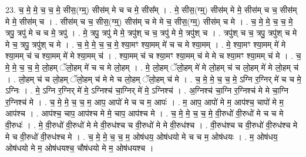\documentclass[17pt]{extarticle}
\begin{document}
23. च॒ मे॒ मे॒ च॒ च॒ मे॒ सीस॒(ग्म्॒) सीस॑म् मे च च मे॒ सीस᳚म् । . मे॒ सीस॒(ग्म्॒) सीस॑म् मे मे॒ सीस॑म् च च॒ सीस॑म् मे मे॒ सीस॑म् च । . सीस॑म् च च॒ सीस॒(ग्म्॒) सीस॑म् च मे मे च॒ सीस॒(ग्म्॒) सीस॑म् च मे । . च॒ मे॒ मे॒ च॒ च॒ मे॒ त्रपु॒ त्रपु॑ मे च च मे॒ त्रपु॑ । . मे॒ त्रपु॒ त्रपु॑ मे मे॒ त्रपु॑श् च च॒ त्रपु॑ मे मे॒ त्रपु॑श् च । . त्रपु॑श् च च॒ त्रपु॒ त्रपु॑श् च मे मे च॒ त्रपु॒ त्रपु॑श् च मे । . च॒ मे॒ मे॒ च॒ च॒ मे॒ श्या॒मꣳ श्या॒मम् मे॑ च च मे श्या॒मम् । . मे॒ श्या॒मꣳ श्या॒मम् मे॑ मे श्या॒मम् च॑ च श्या॒मम् मे॑ मे श्या॒मम् च॑ । . श्या॒मम् च॑ च श्या॒मꣳ श्या॒मम् च॑ मे मे च श्या॒मꣳ श्या॒मम् च॑ मे । . च॒ मे॒ मे॒ च॒ च॒ मे॒ लो॒हम् ॅलो॒हम् मे॑ च च मे लो॒हम् । . मे॒ लो॒हम् ॅलो॒हम् मे॑ मे लो॒हम् च॑ च लो॒हम् मे॑ मे लो॒हम् च॑ । . लो॒हम् च॑ च लो॒हम् ॅलो॒हम् च॑ मे मे च लो॒हम् ॅलो॒हम् च॑ मे । . च॒ मे॒ मे॒ च॒ च॒ मे॒ ऽग्नि र॒ग्निर् मे॑ च च मे॒ ऽग्निः । . मे॒ ऽग्नि र॒ग्निर् मे॑ मे॒ ऽग्निश्च॑ चा॒ग्निर् मे॑ मे॒ ऽग्निश्च॑ । . अ॒ग्निश्च॑ चा॒ग्नि र॒ग्निश्च॑ मे मे चा॒ग्नि र॒ग्निश्च॑ मे । . च॒ मे॒ मे॒ च॒ च॒ म॒ आप॒ आपो॑ मे च च म॒ आपः॑ । . म॒ आप॒ आपो॑ मे म॒ आप॑श्च॒ चापो॑ मे म॒ आप॑श्च । . आप॑श्च॒ चाप॒ आप॑श्च मे मे॒ चाप॒ आप॑श्च मे । . च॒ मे॒ मे॒ च॒ च॒ मे॒ वी॒रुधो॑ वी॒रुधो॑ मे च च मे वी॒रुधः॑ । . मे॒ वी॒रुधो॑ वी॒रुधो॑ मे मे वी॒रुध॑श्च च वी॒रुधो॑ मे मे वी॒रुध॑श्च । . वी॒रुध॑श्च च वी॒रुधो॑ वी॒रुध॑श्च मे मे च वी॒रुधो॑ वी॒रुध॑श्च मे । . च॒ मे॒ मे॒ च॒ च॒ म॒ ओष॑धय॒ ओष॑धयो मे च च म॒ ओष॑धयः । . म॒ ओष॑धय॒ ओष॑धयो मे म॒ ओष॑धयश्च॒ चौष॑धयो मे म॒ ओष॑धयश्च । \newline
\end{document}
